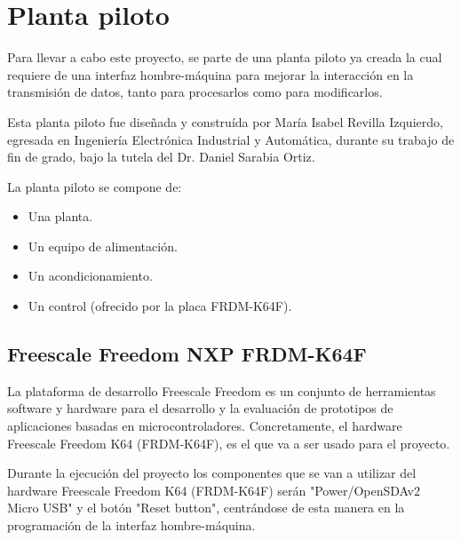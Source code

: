 

\section{Planta piloto}

Para llevar a cabo este proyecto, se parte de una planta piloto ya creada la cual requiere de una interfaz hombre-máquina para mejorar la interacción en la transmisión de datos, tanto para procesarlos como para modificarlos.



Esta planta piloto fue diseñada y construída por María Isabel Revilla Izquierdo, egresada en Ingeniería Electrónica Industrial y Automática, durante su trabajo de fin de grado, bajo la tutela del Dr. Daniel Sarabia Ortiz.

La planta piloto se compone de:
\begin{itemize}
	\item Una planta.
	\item Un equipo de alimentación.
	\item Un acondicionamiento.
	\item Un control (ofrecido por la placa FRDM-K64F).
\end{itemize} 


\subsection{Freescale Freedom NXP FRDM-K64F}

La plataforma de desarrollo Freescale Freedom es un conjunto de herramientas software y hardware para el desarrollo y la evaluación de prototipos de aplicaciones basadas en microcontroladores. Concretamente, el hardware Freescale Freedom K64 (FRDM-K64F), es el que va a ser usado para el proyecto.


Durante la ejecución del proyecto los componentes que se van a utilizar del hardware Freescale Freedom K64 (FRDM-K64F) serán "Power/OpenSDAv2 Micro USB" y el botón "Reset button", centrándose de esta manera en la programación de la interfaz hombre-máquina.

